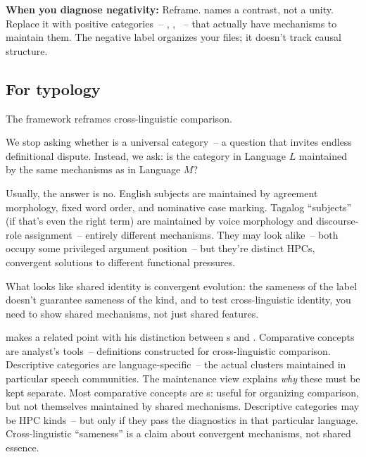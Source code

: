 \textbf{When you diagnose negativity:} Reframe.  names a contrast, not a unity. Replace it with positive categories~-- , , ~-- that actually have mechanisms to maintain them. The negative label organizes your files; it doesn't track causal structure.

\subsection{For typology}
\label{sec:8:for-typology}

The framework reframes cross-linguistic comparison.

We stop asking whether  is a universal category~-- a question that invites endless definitional dispute. Instead, we ask: is the category  in Language $L$ maintained by the same mechanisms as in Language $M$?

Usually, the answer is no. English subjects are maintained by agreement morphology, fixed word order, and nominative case marking. Tagalog \enquote{subjects} (if that's even the right term) are maintained by voice morphology and discourse-role assignment~-- entirely different mechanisms. They may look alike~-- both occupy some privileged argument position~-- but they're distinct HPCs, convergent solutions to different functional pressures.

What looks like shared identity is convergent evolution: the sameness of the label doesn't guarantee sameness of the kind, and to test cross-linguistic identity, you need to show shared mechanisms, not just shared features.

\textcite{haspelmath2010} makes a related point with his distinction between s and . Comparative concepts are analyst's tools~-- definitions constructed for cross-linguistic comparison. Descriptive categories are language-specific~-- the actual clusters maintained in particular speech communities. The maintenance view explains \emph{why} these must be kept separate. Most comparative concepts are s: useful for organizing comparison, but not themselves maintained by shared mechanisms. Descriptive categories may be HPC kinds~-- but only if they pass the diagnostics in that particular language. Cross-linguistic \enquote{sameness} is a claim about convergent mechanisms, not shared essence.

